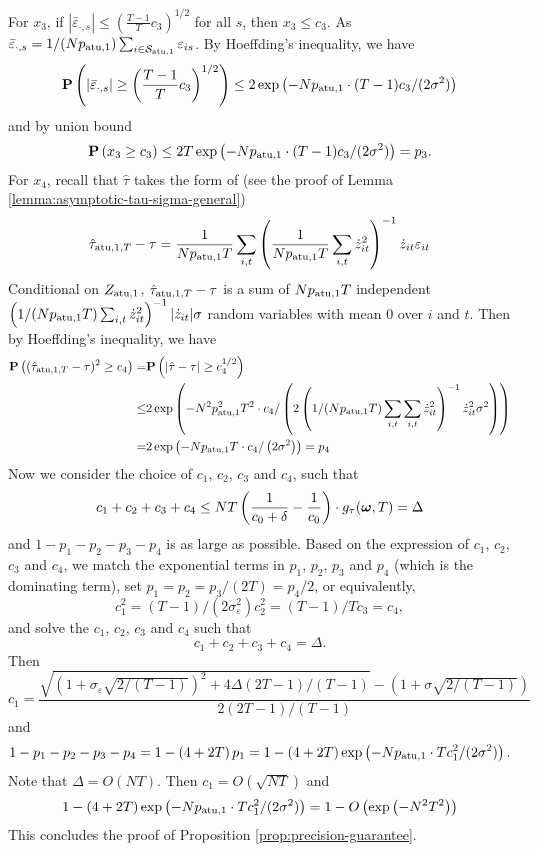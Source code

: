 For $x_3$, if $|\bar{\varepsilon}_{\cdot,s}| \leq 
\left(\frac{T-1}{T} c_3\right)^{1/2}$ for all $s$, then $x_3 \leq c_3$. As $\bar{\varepsilon}_{\cdot,s} = 1/(N p_{\mathrm{atu},1}) \sum_{i \in \mathcal{S}_{\mathrm{atu},1}} \varepsilon_{is}$. By Hoeffding's inequality, we have 
\[\mathbf{P}\left(|\bar{\varepsilon}_{\cdot,s}| \geq \left(\frac{T-1}{T} c_3\right)^{1/2} \right) \leq 2 \exp\left(-N  p_{\mathrm{atu},1} \cdot (T-1) c_3/(2\sigma^2) \right)\]
and by union bound
\[\mathbf{P}\left(x_3 \geq c_3 \right) \leq 2 T  \exp\left(-N  p_{\mathrm{atu},1} \cdot (T-1) c_3/(2\sigma^2) \right)= p_3.\]
For $x_4$, recall that $\hat{\tau}$ takes the form of (see the proof of Lemma \ref{lemma:asymptotic-tau-sigma-general})
\[\hat{\tau}_{\mathrm{atu},1,T} - \tau =\frac{1}{N p_{\mathrm{atu},1} T} \sum_{i,t}  \left(\frac{1}{N p_{\mathrm{atu},1} T} \sum_{i,t} \dot{z}_{it}^2 \right)^{-1} \dot{z}_{it} \varepsilon_{it} \]
Conditional on $Z_{\mathrm{atu},1}$, $\hat{\tau}_{\mathrm{atu},1,T} - \tau$ is a sum of $N p_{\mathrm{atu},1} T$ independent $ \left(1/(N p_{\mathrm{atu},1} T) \sum_{i,t} \dot{z}_{it}^2 \right)^{-1} |\dot{z}_{it}| \sigma$ random variables with mean $0$ over $i$ and $t$. Then by Hoeffding's inequality, we have 
\begin{align*}
    \mathbf{P}\left((\hat{\tau}_{\mathrm{atu},1,T} - \tau)^2 \geq c_4 \right) =& \mathbf{P}\left(|\hat{\tau} - \tau| \geq  c_4^{1/2} \right) \\
    \leq& 2 \exp\left(-N^2  p^2_{\mathrm{atu},1} T^2 \cdot  c_4/\left(2 \left(1/(N p_{\mathrm{atu},1} T) \sum_{i,t} \sum_{i,t} \dot{z}_{it}^2 \right)^{-1} \dot{z}_{it}^2 \sigma^2\right) \right) \\
    =& 2 \exp\left(-N  p_{\mathrm{atu},1} T \cdot  c_4/\left(2 \sigma^2\right) \right)= p_4
\end{align*}
Now we consider the choice of $c_1$, $c_2$, $c_3$ and $c_4$, such that 
\[c_1 + c_2 + c_3 + c_4 \leq NT\left(\frac{1}{c_0 + \delta} - \frac{1}{c_0}  \right)\cdot g_\tau(\bm{\omega}, T) = \Delta \]
and $1 - p_1 - p_2 - p_3 - p_4$ is as large as possible. Based on the expression of $c_1$, $c_2$, $c_3$ and $c_4$, we match the exponential terms in $p_1$, $p_2$, $p_3$ and $p_4$ (which is the dominating term), set
$p_1 = p_2 = p_3/(2T) = p_4/2$, or equivalently, 
\[c_1^2 = (T-1)/(2\sigma_\varepsilon^2) c_2^2 = (T-1)/T c_3 = c_4, \]
and solve the $c_1$, $c_2$, $c_3$ and $c_4$ such that
\[c_1 + c_2 + c_3 + c_4 = \Delta. \]
Then 
\[c_1 = \frac{\sqrt{\left(1+\sigma_\varepsilon \sqrt{2/(T-1)}  \right)^2 + 4 \Delta (2T-1)/(T-1) } -  \left(1+\sigma \sqrt{2/(T-1)}  \right)}{2  (2T-1)/(T-1) } \]
and
\begin{align*}
    1 - p_1 - p_2 - p_3 - p_4 = 1 - \left(4 + 2T \right) p_1 =1 - \left(4 + 2T \right) \exp\left(-N  p_{\mathrm{atu},1} \cdot T c_1^2/(2\sigma^2) \right).
\end{align*}
Note that $\Delta = O(NT)$. Then $c_1 = O(\sqrt{NT})$ and 
\[1 - \left(4 + 2T \right) \exp\left(-N  p_{\mathrm{atu},1} \cdot T c_1^2/(2\sigma^2) \right) = 1 - O\left(  \exp\left(-N^2 T^2 \right) \right)\]
%
This concludes the proof of Proposition \ref{prop:precision-guarantee}.
\halmos





